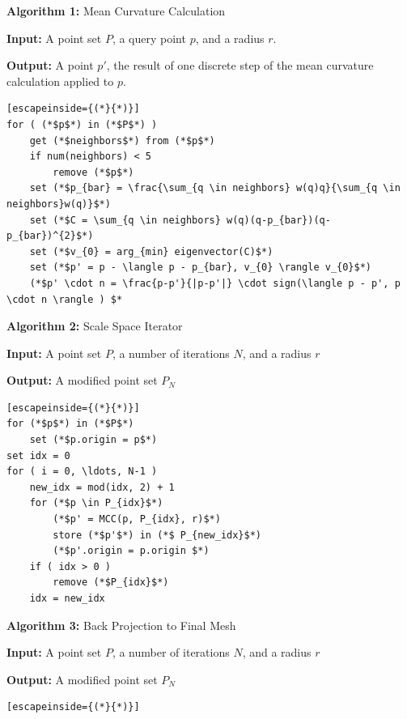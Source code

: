 \documentclass[12pt]{drexelthesis}
\begin{document}
\textbf{Algorithm 1:} Mean Curvature Calculation

	\textbf{Input:} A point set $P$, a query point $p$, and a radius $r$.
	
	\textbf{Output:} A point $p'$, the result of one discrete step of the mean curvature calculation applied to $p$.
\begin{lstlisting}[escapeinside={(*}{*)}]
for ( (*$p$*) in (*$P$*) )
	get (*$neighbors$*) from (*$p$*)
	if num(neighbors) < 5
		remove (*$p$*)
	set (*$p_{bar} = \frac{\sum_{q \in neighbors} w(q)q}{\sum_{q \in neighbors}w(q)}$*)
	set (*$C = \sum_{q \in neighbors} w(q)(q-p_{bar})(q-p_{bar})^{2}$*)
	set (*$v_{0} = arg_{min} eigenvector(C)$*)
	set (*$p' = p - \langle p - p_{bar}, v_{0} \rangle v_{0}$*)
	(*$p' \cdot n = \frac{p-p'}{|p-p'|} \cdot sign(\langle p - p', p \cdot n \rangle ) $*	
\end{lstlisting}

\textbf{Algorithm 2:} Scale Space Iterator

	\textbf{Input:} A point set $P$, a number of iterations $N$, and a radius $r$
	
	\textbf{Output:} A modified point set $P_{N}$


\begin{lstlisting}[escapeinside={(*}{*)}]
for (*$p$*) in (*$P$*)
	set (*$p.origin = p$*)
set idx = 0
for ( i = 0, \ldots, N-1 )
	new_idx = mod(idx, 2) + 1
	for (*$p \in P_{idx}$*)
		(*$p' = MCC(p, P_{idx}, r)$*)
		store (*$p'$*) in (*$ P_{new_idx}$*)
		(*$p'.origin = p.origin $*)
	if ( idx > 0 )
		remove (*$P_{idx}$*)
	idx = new_idx
\end{lstlisting}

\textbf{Algorithm 3:} Back Projection to Final Mesh

	\textbf{Input:} A point set $P$, a number of iterations $N$, and a radius $r$
	
	\textbf{Output:} A modified point set $P_{N}$


\begin{lstlisting}[escapeinside={(*}{*)}]
\end{lstlisting}
\end{document}
